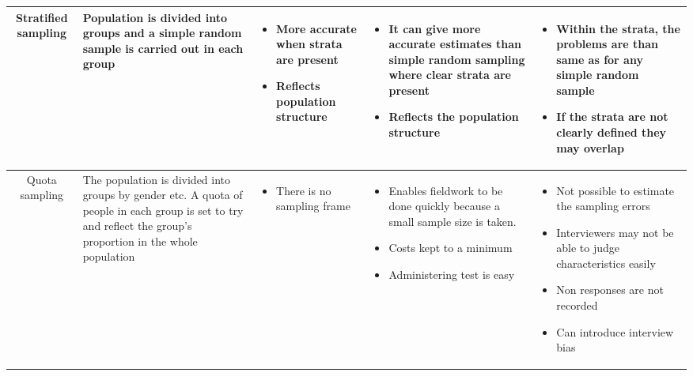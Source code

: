 \documentclass{article}[5pt]
\begin{document}
\begin{tabularx}{\textwidth}{|c|X|X|X|X|}
Stratified sampling
&Population is divided into groups and a simple random sample is carried out in each group&

\begin{itemize}
\item More accurate when strata are present
\item Reflects population structure
\end{itemize}&

\begin{itemize}
\item It can give more accurate estimates than simple random sampling where clear strata are present
\item Reflects the population structure
\end{itemize}&
\begin{itemize}
\item Within the strata, the problems are than same as for any simple random sample
\item If the strata are not clearly defined they may overlap
\end{itemize}\\
\hline

Quota sampling
&The population is divided into groups by gender etc. A quota of people in each group is set to try and reflect the group's proportion in the whole population&
\begin{itemize}
\item There is no sampling frame
\end{itemize}&

\begin{itemize}
\item Enables fieldwork to be done quickly because a small sample size is taken.
\item Costs kept to a minimum
\item Administering test is easy
\end{itemize}&
\begin{itemize}
\item Not possible to estimate the sampling errors
\item Interviewers may not be able to judge characteristics easily
\item Non responses are not recorded
\item Can introduce interview bias
\end{itemize}\\
\hline
\end{tabularx}
\end{document}
